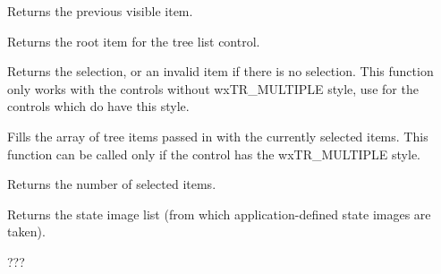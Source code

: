 \label{wxtreelistctrlgetprevvisible}


Returns the previous visible item.

\label{wxtreelistctrlgetrootitem}


Returns the root item for the tree list control.

\label{wxtreelistctrlgetselection}


Returns the selection, or an invalid item if there is no selection.
This function only works with the controls without wxTR\_MULTIPLE style, use
 for the controls which do have
this style.

\label{wxtreelistctrlgetselections}


Fills the array of tree items passed in with the currently selected items. This
function can be called only if the control has the wxTR\_MULTIPLE style.

Returns the number of selected items.



\label{wxtreelistctrlgetstateimagelist}


Returns the state image list (from which application-defined state images are taken).

\label{wxtreelistctrlgetwindowstyle}


???

\label{wxtreelistctrlgetwindowstyleflag}

